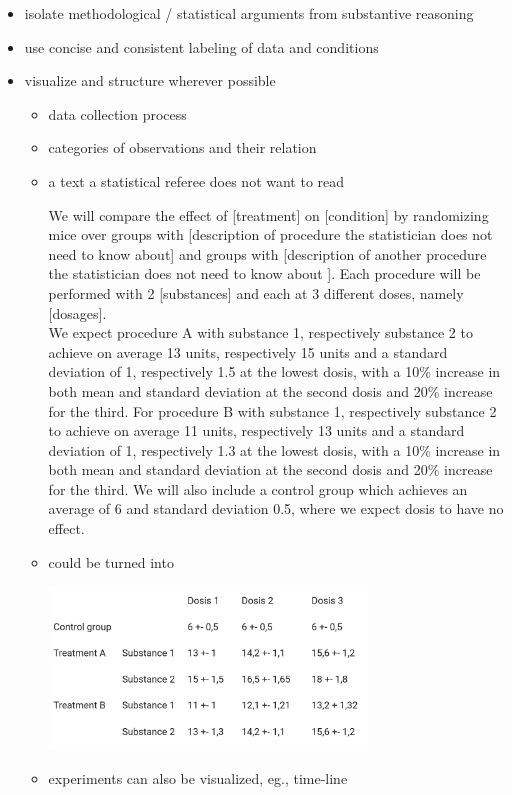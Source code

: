 \documentclass[
]{article}
\begin{document}
\begin{itemize}
\item
  isolate methodological / statistical arguments from substantive
  reasoning
\item
  use concise and consistent labeling of data and conditions
\item
  visualize and structure wherever possible

  \begin{itemize}
  \item
    data collection process
  \item
    categories of observations and their relation
  \item
    a text a statistical referee does not want to read

    We will compare the effect of {[}treatment{]} on {[}condition{]} by
    randomizing mice over groups with {[}description of procedure the
    statistician does not need to know about{]} and groups with
    {[}description of another procedure the statistician does not need
    to know about {]}. Each procedure will be performed with 2
    {[}substances{]} and each at 3 different doses, namely
    {[}dosages{]}.\\
    We expect procedure A with substance 1, respectively substance 2 to
    achieve on average 13 units, respectively 15 units and a standard
    deviation of 1, respectively 1.5 at the lowest dosis, with a 10\%
    increase in both mean and standard deviation at the second dosis and
    20\% increase for the third. For procedure B with substance 1,
    respectively substance 2 to achieve on average 11 units,
    respectively 13 units and a standard deviation of 1, respectively
    1.3 at the lowest dosis, with a 10\% increase in both mean and
    standard deviation at the second dosis and 20\% increase for the
    third. We will also include a control group which achieves an
    average of 6 and standard deviation 0.5, where we expect dosis to
    have no effect.
  \item
    could be turned into

    \includegraphics[width=0.7\textwidth,height=\textheight]{tableECD.png}
  \item
    experiments can also be visualized, eg., time-line


\end{itemize}
\end{itemize}
\end{document}
